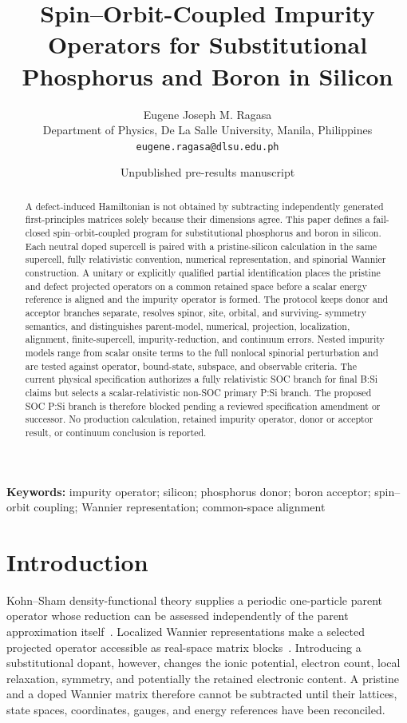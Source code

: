 \documentclass[11pt]{article}
\title{Spin--Orbit-Coupled Impurity Operators for Substitutional\\
Phosphorus and Boron in Silicon}
\author{Eugene Joseph M. Ragasa\\
Department of Physics, De La Salle University, Manila, Philippines\\
\texttt{eugene.ragasa@dlsu.edu.ph}}
\date{Unpublished pre-results manuscript}
\begin{document}
\maketitle

\begin{abstract}
A defect-induced Hamiltonian is not obtained by subtracting independently generated
first-principles matrices solely because their dimensions agree. This paper defines a
fail-closed spin--orbit-coupled program for substitutional phosphorus and boron in
silicon. Each neutral doped supercell is paired with a pristine-silicon calculation in
the same supercell, fully relativistic convention, numerical representation, and
spinorial Wannier construction. A unitary or explicitly qualified partial identification
places the pristine and defect projected operators on a common retained space before a
scalar energy reference is aligned and the impurity operator is formed. The protocol
keeps donor and acceptor branches separate, resolves spinor, site, orbital, and surviving-
symmetry semantics, and distinguishes parent-model, numerical, projection, localization,
alignment, finite-supercell, impurity-reduction, and continuum errors. Nested impurity
models range from scalar onsite terms to the full nonlocal spinorial perturbation and are
tested against operator, bound-state, subspace, and observable criteria. The current
physical specification authorizes a fully relativistic SOC branch for final B:Si claims
but selects a scalar-relativistic non-SOC primary P:Si branch. The proposed SOC P:Si
branch is therefore blocked pending a reviewed specification amendment or successor.
No production calculation, retained impurity operator, donor or acceptor result, or
continuum conclusion is reported.
\end{abstract}

\noindent\textbf{Keywords:} impurity operator; silicon; phosphorus donor; boron
acceptor; spin--orbit coupling; Wannier representation; common-space alignment

\section{Introduction}
Kohn--Sham density-functional theory supplies a periodic one-particle parent operator
whose reduction can be assessed independently of the parent approximation
itself~\cite{hohenberg1964,kohn1965}. Localized Wannier representations make a selected
projected operator accessible as real-space matrix blocks~\cite{marzari2012,Pizzi2020}.
Introducing a substitutional dopant, however, changes the ionic potential, electron
count, local relaxation, symmetry, and potentially the retained electronic content. A
pristine and a doped Wannier matrix therefore cannot be subtracted until their lattices,
state spaces, coordinates, gauges, and energy references have been reconciled.
\end{document}

